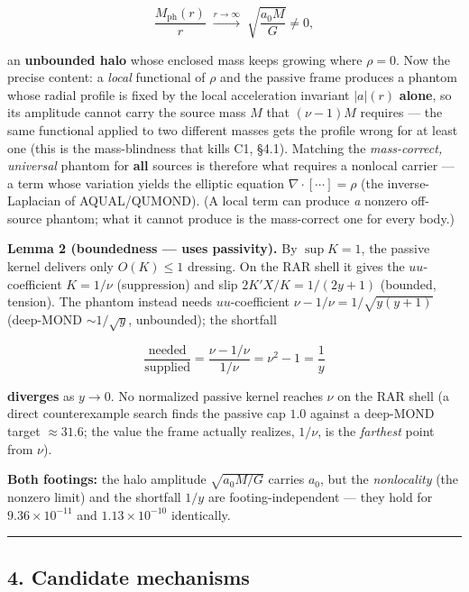 \documentclass[
]{article}
\begin{document}
\[
\frac{M_\mathrm{ph}(r)}{r}\;\xrightarrow{r\to\infty}\;\sqrt{\frac{a_0 M}{G}}\neq 0 ,
\]

an \textbf{unbounded halo} whose enclosed mass keeps growing where
\(\rho=0\). Now the precise content: a \emph{local} functional of
\(\rho\) and the passive frame produces a phantom whose radial profile
is fixed by the local acceleration invariant \(|a|(r)\) \textbf{alone},
so its amplitude cannot carry the source mass \(M\) that \((\nu-1)M\)
requires --- the same functional applied to two different masses gets
the profile wrong for at least one (this is the mass-blindness that
kills C1, §4.1). Matching the \emph{mass-correct, universal} phantom for
\textbf{all} sources is therefore what requires a nonlocal carrier --- a
term whose variation yields the elliptic equation
\(\nabla\cdot[\cdots]=\rho\) (the inverse-Laplacian of AQUAL/QUMOND). (A
local term can produce \emph{a} nonzero off-source phantom; what it
cannot produce is the mass-correct one for every body.)

\textbf{Lemma 2 (boundedness --- uses passivity).} By \(\sup K = 1\),
the passive kernel delivers only \(O(K)\le1\) dressing. On the RAR shell
it gives the \(uu\)-coefficient \(K=1/\nu\) (suppression) and slip
\(2K'X/K=1/(2y+1)\) (bounded, tension). The phantom instead needs
\(uu\)-coefficient \(\nu-1/\nu = 1/\sqrt{y(y+1)}\) (deep-MOND
\(\sim1/\sqrt y\), unbounded); the shortfall

\[
\frac{\text{needed}}{\text{supplied}} = \frac{\nu-1/\nu}{1/\nu} = \nu^2-1 = \frac{1}{y}
\]

\textbf{diverges} as \(y\to0\). No normalized passive kernel reaches
\(\nu\) on the RAR shell (a direct counterexample search finds the
passive cap \(1.0\) against a deep-MOND target \(\approx31.6\); the
value the frame actually realizes, \(1/\nu\), is the \emph{farthest}
point from \(\nu\)).

\textbf{Both footings:} the halo amplitude \(\sqrt{a_0 M/G}\) carries
\(a_0\), but the \emph{nonlocality} (the nonzero limit) and the
shortfall \(1/y\) are footing-independent --- they hold for
\(9.36\times10^{-11}\) and \(1.13\times10^{-10}\) identically.

\begin{center}\rule{0.5\linewidth}{0.5pt}\end{center}

\subsection{4. Candidate mechanisms}\label{candidate-mechanisms}
\end{document}
